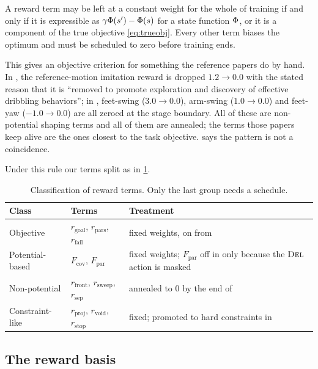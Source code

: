\documentclass[11pt,a4paper]{article}
\begin{document}
\begin{designrule}\label{rule:anneal}
A reward term may be left at a constant weight for the whole of training if and only if it
is expressible as $\gamma\Phi(s')-\Phi(s)$ for a state function $\Phi$, or it is a
component of the true objective \eqref{eq:trueobj}. Every other term biases the optimum and
must be scheduled to zero before training ends.
\end{designrule}

This gives an objective criterion for something the reference papers do by hand. In
\citet{wang2025dribble}, the reference-motion imitation reward is dropped $1.2 \to 0.0$ with
the stated reason that it is ``removed to promote exploration and discovery of effective
dribbling behaviors''; in \citet{xu2025striker}, feet-swing ($3.0 \to 0.0$), arm-swing
($1.0 \to 0.0$) and feet-yaw ($-1.0 \to 0.0$) are all zeroed at the stage boundary. All of
these are non-potential shaping terms and all of them are annealed; the terms those papers
keep alive are the ones closest to the task objective.  says the pattern
is not a coincidence.

Under this rule our terms split as in \cref{tab:invariance}.

\begin{table}[t]
\centering
\small
\caption{Classification of reward terms. Only the last group needs a schedule.}
\label{tab:invariance}
\begin{tabularx}{\linewidth}{@{}l l X@{}}
\toprule
\textbf{Class} & \textbf{Terms} & \textbf{Treatment} \\
\midrule
Objective        & $r_{\mathrm{goal}}$, $r_{\mathrm{pars}}$, $r_{\mathrm{fail}}$ & fixed weights, on from \stageI{} \\
Potential-based  & $F_{\mathrm{cov}}$, $F_{\mathrm{par}}$ & fixed weights; $F_{\mathrm{par}}$ off in \stageI{} only because the $\textsc{Del}$ action is masked \\
Non-potential    & $r_{\mathrm{front}}$, $r_{\mathrm{sweep}}$, $r_{\mathrm{sep}}$ & annealed to $0$ by the end of \stageI{} \\
Constraint-like  & $r_{\mathrm{proj}}$, $r_{\mathrm{void}}$, $r_{\mathrm{stop}}$ & fixed; promoted to hard constraints in \stageIII{} \\
\bottomrule
\end{tabularx}
\end{table}

\subsection{The reward basis}
\end{document}
